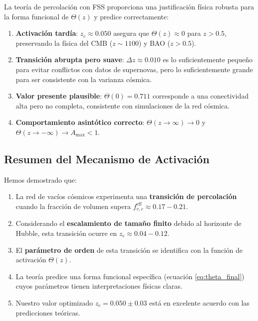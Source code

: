 \documentclass[12pt, a4paper]{article}
\theoremstyle{plain}
\theoremstyle{definition}
\begin{document}
La teoría de percolación con FSS proporciona una justificación física robusta para la forma funcional de $\Theta(z)$ y predice correctamente:

\begin{enumerate}
    \item \textbf{Activación tardía}: $z_c \approx 0.050$ asegura que $\Theta(z) \approx 0$ para $z > 0.5$, preservando la física del CMB ($z \sim 1100$) y BAO ($z > 0.5$).
    
    \item \textbf{Transición abrupta pero suave}: $\Delta z \approx 0.010$ es lo suficientemente pequeño para evitar conflictos con datos de supernovas, pero lo suficientemente grande para ser consistente con la varianza cósmica.
    
    \item \textbf{Valor presente plausible}: $\Theta(0) = 0.711$ corresponde a una conectividad alta pero no completa, consistente con simulaciones de la red cósmica.
    
    \item \textbf{Comportamiento asintótico correcto}: $\Theta(z \to \infty) \to 0$ y $\Theta(z \to -\infty) \to A_{\max} < 1$.
\end{enumerate}

\subsection{Resumen del Mecanismo de Activación}

Hemos demostrado que:

\begin{enumerate}
    \item La red de vacíos cósmicos experimenta una \textbf{transición de percolación} cuando la fracción de volumen supera $f_{v,c}^{\text{eff}} \approx 0.17-0.21$.
    
    \item Considerando el \textbf{escalamiento de tamaño finito} debido al horizonte de Hubble, esta transición ocurre en $z_c \approx 0.04-0.12$.
    
    \item El \textbf{parámetro de orden} de esta transición se identifica con la función de activación $\Theta(z)$.
    
    \item La teoría predice una forma funcional específica (ecuación \ref{eq:theta_final}) cuyos parámetros tienen interpretaciones físicas claras.
    
    \item Nuestro valor optimizado $z_c = 0.050 \pm 0.03$ está en excelente acuerdo con las predicciones teóricas.
\end{enumerate}
\end{document}
